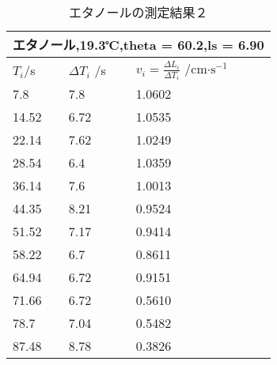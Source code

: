\documentclass{jsarticle}
\begin{document}
\begin{table}[H]
\centering
\caption{エタノールの測定結果２}
\label{my-label}
\begin{tabular}{|l|l|l|}
\hline
\multicolumn{3}{|l|}{エタノール,19.3℃,theta = 60.2,ls = 6.90} \\ \hline
$T_i $/s   & $\Delta T_i $ /s  & $v_i = \frac{\Delta L_i}{\Delta T_i}$ /cm$\cdot \textrm{s}^{-1}$   \\ \hline
7.8             & 7.8            & 1.0602           \\ \hline
14.52           & 6.72           & 1.0535           \\ \hline
22.14           & 7.62           & 1.0249           \\ \hline
28.54           & 6.4            & 1.0359           \\ \hline
36.14           & 7.6            & 1.0013           \\ \hline
44.35           & 8.21           & 0.9524           \\ \hline
51.52           & 7.17           & 0.9414           \\ \hline
58.22           & 6.7            & 0.8611           \\ \hline
64.94           & 6.72           & 0.9151           \\ \hline
71.66           & 6.72           & 0.5610           \\ \hline
78.7            & 7.04           & 0.5482           \\ \hline
87.48           & 8.78           & 0.3826           \\ \hline
\end{tabular}
\end{table}
\end{document}
